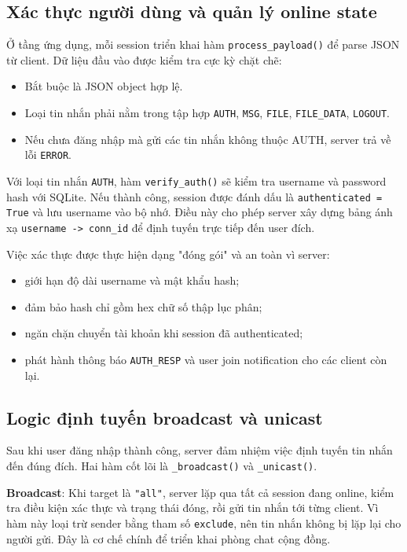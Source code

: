 \subsection{Xác thực người dùng và quản lý online state}
Ở tầng ứng dụng, mỗi session triển khai hàm \texttt{process\_payload()} để parse JSON từ client. Dữ liệu đầu vào được kiểm tra cực kỳ chặt chẽ:
\begin{itemize}
    \item Bắt buộc là JSON object hợp lệ.
    \item Loại tin nhắn phải nằm trong tập hợp \texttt{AUTH}, \texttt{MSG}, \texttt{FILE}, \texttt{FILE\_DATA}, \texttt{LOGOUT}.
    \item Nếu chưa đăng nhập mà gửi các tin nhắn không thuộc AUTH, server trả về lỗi \texttt{ERROR}.
\end{itemize}

Với loại tin nhắn \texttt{AUTH}, hàm \texttt{verify\_auth()} sẽ kiểm tra username và password hash với SQLite. Nếu thành công, session được đánh dấu là \texttt{authenticated = True} và lưu username vào bộ nhớ. Điều này cho phép server xây dựng bảng ánh xạ \texttt{username -> conn\_id} để định tuyến trực tiếp đến user đích.

Việc xác thực được thực hiện dạng "đóng gói" và an toàn vì server:
\begin{itemize}
    \item giới hạn độ dài username và mật khẩu hash;
    \item đảm bảo hash chỉ gồm hex chữ số thập lục phân; 
    \item ngăn chặn chuyển tài khoản khi session đã authenticated; 
    \item phát hành thông báo \texttt{AUTH\_RESP} và user join notification cho các client còn lại.
\end{itemize}

\subsection{Logic định tuyến broadcast và unicast}
Sau khi user đăng nhập thành công, server đảm nhiệm việc định tuyến tin nhắn đến đúng đích. Hai hàm cốt lõi là \texttt{\_broadcast()} và \texttt{\_unicast()}.

\textbf{Broadcast}: Khi target là \texttt{"all"}, server lặp qua tất cả session đang online, kiểm tra điều kiện xác thực và trạng thái đóng, rồi gửi tin nhắn tới từng client. Vì hàm này loại trừ sender bằng tham số \texttt{exclude}, nên tin nhắn không bị lặp lại cho người gửi. Đây là cơ chế chính để triển khai phòng chat cộng đồng.

